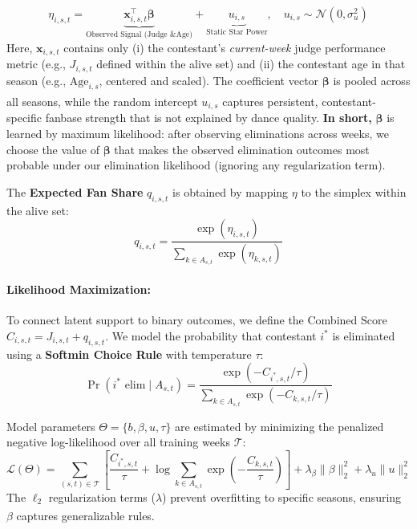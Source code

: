 \documentclass[12pt]{article}
\begin{document}
\begin{equation} \label{eq:latent_score}
	\eta_{i,s,t} = 
	\underbrace{\mathbf{x}_{i,s,t}^{\top}\boldsymbol{\beta}}_{\text{Observed Signal (Judge \& Age)}} 
	+ \underbrace{u_{i,s}}_{\text{Static Star Power}}, 
	\quad u_{i,s} \sim \mathcal{N}(0, \sigma_u^2)
\end{equation}
Here, $\mathbf{x}_{i,s,t}$ contains only (i) the contestant's \emph{current-week} judge performance metric
(e.g., $J_{i,s,t}$ defined within the alive set) and (ii) the contestant age in that season
(e.g., $\text{Age}_{i,s}$, centered and scaled).
The coefficient vector $\boldsymbol{\beta}$ is pooled across all seasons, while the random intercept
$u_{i,s}$  \textsuperscript{\cite{laird1982}}captures persistent, contestant-specific fanbase strength that is not explained by dance quality.
\textbf{In short,} $\boldsymbol{\beta}$ is learned by maximum likelihood: after observing eliminations across
weeks, we choose the value of $\boldsymbol{\beta}$ that makes the observed elimination outcomes most probable
under our elimination likelihood (ignoring any regularization term).


The \textbf{Expected Fan Share} $q_{i,s,t}$ is obtained by mapping $\eta$ to the simplex within the alive set:
\begin{equation} \label{eq:prior_mean}
	q_{i,s,t} = \frac{\exp(\eta_{i,s,t})}{\sum_{k \in A_{s,t}} \exp(\eta_{k,s,t})}
\end{equation}

\paragraph{Likelihood Maximization:}

To connect latent support to binary outcomes, we define the Combined Score $C_{i,s,t} = J_{i,s,t} + q_{i,s,t}$. We model the probability that contestant $i^*$ is eliminated using a \textbf{Softmin Choice Rule} with temperature $\tau$:
\begin{equation}
	\Pr(i^* \text{ elim} \mid A_{s,t}) = \frac{\exp(-C_{i^*,s,t}/\tau)}{\sum_{k \in A_{s,t}} \exp(-C_{k,s,t}/\tau)}
\end{equation}

Model parameters $\Theta = \{b, \beta, u, \tau\}$ are estimated by minimizing the penalized negative log-likelihood over all training weeks $\mathcal{T}$:
\begin{equation}
	\mathcal{L}(\Theta) = \sum_{(s,t) \in \mathcal{T}} \left[ \frac{C_{i^*,s,t}}{\tau} + \log \sum_{k \in A_{s,t}} \exp\left(-\frac{C_{k,s,t}}{\tau}\right) \right] + \lambda_{\beta}\|\beta\|_2^2 + \lambda_u\|u\|_2^2
\end{equation}
The $\ell_2$ regularization terms ($\lambda$) prevent overfitting to specific seasons, ensuring $\beta$ captures generalizable rules.\textsuperscript{\cite{hoerl1970}}
\end{document}
